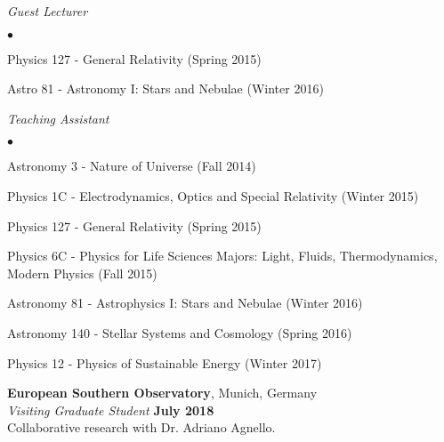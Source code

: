 \documentclass[margin, line]{res}
\newenvironment{list2}{
  \begin{list}{$\bullet$}{%
      \setlength{\itemsep}{0in}
      \setlength{\parsep}{0in} \setlength{\parskip}{0in}
      \setlength{\topsep}{0in} \setlength{\partopsep}{0in} 
      \setlength{\leftmargin}{0.2in}}}{\end{list}}
\begin{document}
\begin{resume}
{\em Guest Lecturer} \hfill {\bf}\\
\begin{list2}
	\item Physics 127 - General Relativity (Spring 2015)
	\item Astro 81 - Astronomy I: Stars and Nebulae (Winter 2016)
\end{list2}
	
{\em Teaching Assistant} \hfill {}\\
\begin{list2}
	\item Astronomy 3 - Nature of Universe (Fall 2014)
	\item Physics 1C - Electrodynamics, Optics and Special Relativity (Winter 2015)
	\item Physics 127 - General Relativity (Spring 2015)
	\item Physics 6C - Physics for Life Sciences Majors: Light, Fluids, Thermodynamics, Modern Physics (Fall 2015)
	\item Astronomy 81 - Astrophysics I: Stars and Nebulae (Winter 2016)
	\item Astronomy 140 - Stellar Systems and Cosmology (Spring 2016)
	\item Physics 12 - Physics of Sustainable Energy (Winter 2017)
\end{list2}

{\bf European Southern Observatory}, Munich, Germany\\
{\em Visiting Graduate Student} \hfill {\bf July 2018}\\
Collaborative research with Dr. Adriano Agnello.






\end{resume}
\end{document}
